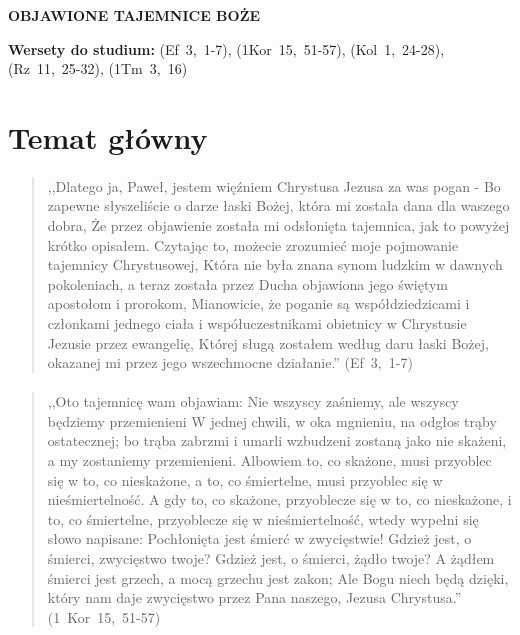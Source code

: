 \documentclass[10pt,a4paper,oneside]{article}
\begin{document}
\centerline{\textbf{\MakeUppercase{Objawione tajemnice Boże}}}
\begin{center}
\textbf{Wersety do studium:} \mbox{(Ef 3, 1-7)}, \mbox{(1Kor 15, 51-57)}, \mbox{(Kol 1, 24-28)}, \mbox{(Rz 11, 25-32)}, \mbox{(1Tm 3, 16)}
\end{center}
\section{Temat główny}
\paragraph{}
\begin{quote}
,,Dlatego ja, Paweł, jestem więźniem Chrystusa Jezusa za was pogan - Bo zapewne słyszeliście o darze łaski Bożej, która mi została dana dla waszego dobra, Że przez objawienie została mi odsłonięta tajemnica, jak to powyżej krótko opisałem. Czytając to, możecie zrozumieć moje pojmowanie tajemnicy Chrystusowej, Która nie była znana synom ludzkim w dawnych pokoleniach, a teraz została przez Ducha objawiona jego świętym apostołom i prorokom, Mianowicie, że poganie są współdziedzicami i członkami jednego ciała i współuczestnikami obietnicy w Chrystusie Jezusie przez ewangelię, Której sługą zostałem według daru łaski Bożej, okazanej mi przez jego wszechmocne działanie.'' \mbox{(Ef 3, 1-7)}
\end{quote}
\paragraph{}
\begin{quote}
,,Oto tajemnicę wam objawiam: Nie wszyscy zaśniemy, ale wszyscy będziemy przemienieni W jednej chwili, w oka mgnieniu, na odgłos trąby ostatecznej; bo trąba zabrzmi i umarli wzbudzeni zostaną jako nie skażeni, a my zostaniemy przemienieni. Albowiem to, co skażone, musi przyoblec się w to, co nieskażone, a to, co śmiertelne, musi przyoblec się w nieśmiertelność. A gdy to, co skażone, przyoblecze się w to, co nieskażone, i to, co śmiertelne, przyoblecze się w nieśmiertelność, wtedy wypełni się słowo napisane: Pochłonięta jest śmierć w zwycięstwie! Gdzież jest, o śmierci, zwycięstwo twoje? Gdzież jest, o śmierci, żądło twoje? A żądłem śmierci jest grzech, a mocą grzechu jest zakon; Ale Bogu niech będą dzięki, który nam daje zwycięstwo przez Pana naszego, Jezusa Chrystusa.'' \mbox{(1 Kor 15, 51-57)}
\end{quote}
\end{document}
